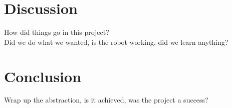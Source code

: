 \documentclass{article}
\begin{document}
\pagebreak


\section*{Discussion}
 \addtocounter{section}{1}
How did things go in this project? \\
Did we do what we wanted, is the robot working, did we learn anything?\\

\section*{Conclusion}
 \addtocounter{section}{1}
Wrap up the abstraction, is it achieved, was the project a success?

\vspace{3mm}
\end{document}
